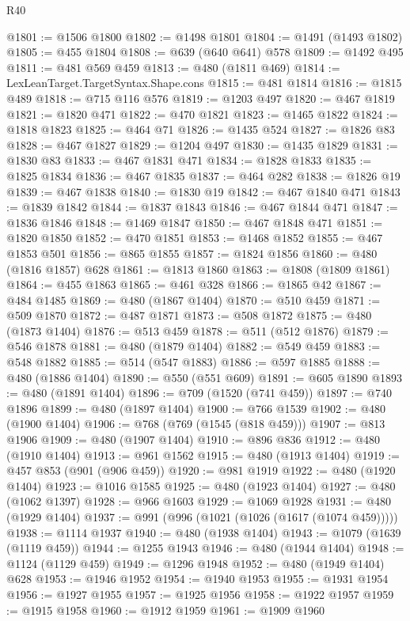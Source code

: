 \begin{lexlean}{R40}
\begin{coremodule}
{{{{{{{{{{{{{{{{{{{{{{{{{{{{{{{{{{{{{{{{{{{{{{{{{{{{{{{{{{{{{{{{{{{{{{{{{{{{{{{{{{{{{{{{{{{{{{{{{{{{{{{{{{{{{@1801 := @1506 @1800
@1802 := @1498 @1801
@1804 := @1491 (@1493 @1802)
@1805 := @455 @1804
@1808 := @639 (@640 @641) @578
@1809 := @1492 @495
@1811 := @481 @569 @459
@1813 := @480 (@1811 @469)
@1814 := LexLeanTarget.TargetSyntax.Shape.cons
@1815 := @481 @1814
@1816 := @1815 @489
@1818 := @715 @116 @576
@1819 := @1203 @497
@1820 := @467 @1819
@1821 := @1820 @471
@1822 := @470 @1821
@1823 := @1465 @1822
@1824 := @1818 @1823
@1825 := @464 @71
@1826 := @1435 @524
@1827 := @1826 @83
@1828 := @467 @1827
@1829 := @1204 @497
@1830 := @1435 @1829
@1831 := @1830 @83
@1833 := @467 @1831 @471
@1834 := @1828 @1833
@1835 := @1825 @1834
@1836 := @467 @1835
@1837 := @464 @282
@1838 := @1826 @19
@1839 := @467 @1838
@1840 := @1830 @19
@1842 := @467 @1840 @471
@1843 := @1839 @1842
@1844 := @1837 @1843
@1846 := @467 @1844 @471
@1847 := @1836 @1846
@1848 := @1469 @1847
@1850 := @467 @1848 @471
@1851 := @1820 @1850
@1852 := @470 @1851
@1853 := @1468 @1852
@1855 := @467 @1853 @501
@1856 := @865 @1855
@1857 := @1824 @1856
@1860 := @480 (@1816 @1857) @628
@1861 := @1813 @1860
@1863 := @1808 (@1809 @1861)
@1864 := @455 @1863
@1865 := @461 @328
@1866 := @1865 @42
@1867 := @484 @1485
@1869 := @480 (@1867 @1404)
@1870 := @510 @459
@1871 := @509 @1870
@1872 := @487 @1871
@1873 := @508 @1872
@1875 := @480 (@1873 @1404)
@1876 := @513 @459
@1878 := @511 (@512 @1876)
@1879 := @546 @1878
@1881 := @480 (@1879 @1404)
@1882 := @549 @459
@1883 := @548 @1882
@1885 := @514 (@547 @1883)
@1886 := @597 @1885
@1888 := @480 (@1886 @1404)
@1890 := @550 (@551 @609)
@1891 := @605 @1890
@1893 := @480 (@1891 @1404)
@1896 := @709 (@1520 (@741 @459))
@1897 := @740 @1896
@1899 := @480 (@1897 @1404)
@1900 := @766 @1539
@1902 := @480 (@1900 @1404)
@1906 := @768 (@769 (@1545 (@818 @459)))
@1907 := @813 @1906
@1909 := @480 (@1907 @1404)
@1910 := @896 @836
@1912 := @480 (@1910 @1404)
@1913 := @961 @1562
@1915 := @480 (@1913 @1404)
@1919 := @457 @853 (@901 (@906 @459))
@1920 := @981 @1919
@1922 := @480 (@1920 @1404)
@1923 := @1016 @1585
@1925 := @480 (@1923 @1404)
@1927 := @480 (@1062 @1397)
@1928 := @966 @1603
@1929 := @1069 @1928
@1931 := @480 (@1929 @1404)
@1937 := @991 (@996 (@1021 (@1026 (@1617 (@1074 @459)))))
@1938 := @1114 @1937
@1940 := @480 (@1938 @1404)
@1943 := @1079 (@1639 (@1119 @459))
@1944 := @1255 @1943
@1946 := @480 (@1944 @1404)
@1948 := @1124 (@1129 @459)
@1949 := @1296 @1948
@1952 := @480 (@1949 @1404) @628
@1953 := @1946 @1952
@1954 := @1940 @1953
@1955 := @1931 @1954
@1956 := @1927 @1955
@1957 := @1925 @1956
@1958 := @1922 @1957
@1959 := @1915 @1958
@1960 := @1912 @1959
@1961 := @1909 @1960
}}}}}}}}}}}}}}}}}}}}}}}}}}}}}}}}}}}}}}}}}}}}}}}}}}}}}}}}}}}}}}}}}}}}}}}}}}}}}}}}}}}}}}}}}}}}}}}}}}}}}}}}}}}}}
\end{coremodule}
\end{lexlean}
